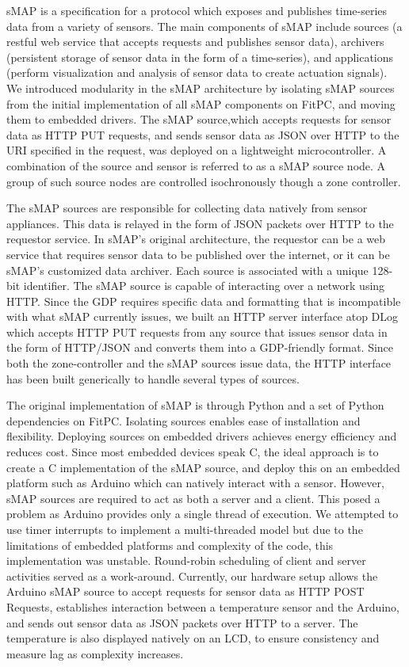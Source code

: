 sMAP is a specification for a protocol which exposes and publishes time-series data from a variety of sensors. The main components of sMAP include sources (a restful web service that accepts requests and publishes sensor data), archivers (persistent storage of sensor data in the form of a time-series), and applications (perform visualization and analysis of sensor data to create actuation signals). We introduced modularity in the sMAP architecture by isolating sMAP sources from the initial implementation of all sMAP components on FitPC, and moving them to embedded drivers. The sMAP source,which accepts requests for sensor data as HTTP PUT requests, and sends sensor data as JSON over HTTP to the URI specified in the request, was deployed on a lightweight microcontroller. A combination of the source and sensor is referred to as a sMAP source node. A group of  such source nodes are controlled isochronously though a zone controller. 

The sMAP sources are responsible for collecting data natively from sensor appliances. This data is relayed in the form of JSON packets over HTTP to the requestor service. In sMAP’s original architecture, the requestor can be a web service that requires sensor data to be published over the internet, or it can be sMAP’s customized data archiver. Each source is associated with a unique 128-bit identifier. The sMAP source is capable of interacting over a network using HTTP. Since the GDP requires specific data and formatting that is incompatible with what sMAP currently issues, we built an HTTP server interface atop DLog which accepts HTTP PUT requests from any source that issues sensor data in the form of HTTP/JSON and converts them into a GDP-friendly format. Since both the zone-controller and the sMAP sources issue data, the HTTP interface has been built generically to handle several types of sources. 

The original implementation of sMAP is through Python and a set of Python dependencies on FitPC. Isolating sources enables ease of installation and flexibility. Deploying sources on embedded drivers achieves energy efficiency and reduces cost. Since most embedded devices speak C, the ideal approach is to create a C implementation of the sMAP source, and deploy this on an embedded platform such as Arduino which can natively interact with a sensor. However, sMAP sources are required to act as both a server and a client. This posed a problem as Arduino provides only a single thread of execution. We attempted to use timer interrupts to implement a multi-threaded model but due to the limitations of embedded platforms and complexity of the code, this implementation was unstable. Round-robin scheduling of client and server activities served as a work-around. Currently, our hardware setup allows the Arduino sMAP source to accept requests for sensor data as HTTP POST Requests, establishes interaction between a temperature sensor and the Arduino, and sends out sensor data as JSON packets over HTTP to a server. The temperature is also displayed natively on an LCD, to ensure consistency and measure lag as complexity increases.

